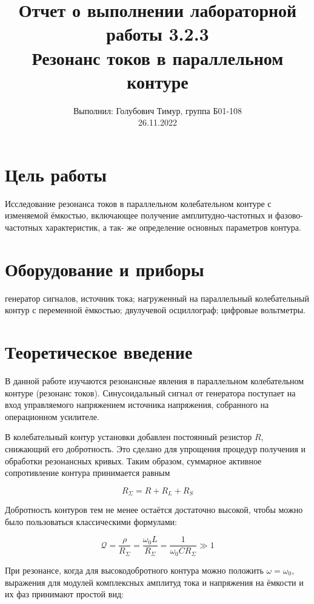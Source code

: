\documentclass[12pt,a4paper]{article}
\author{\normalsize Выполнил: Голубович Тимур, группа Б01-108 \\
	\normalsize 26.11.2022}
\date{}
\title{
	\large Отчет о выполнении лабораторной работы 3.2.3 \\
	\Large Резонанс токов в параллельном контуре \\ 
}
\begin{document}
	\maketitle
	
\section*{Цель работы}
Исследование резонанса токов в параллельном колебательном контуре с изменяемой ёмкостью, включающее получение амплитудно-частотных и фазово-частотных характеристик, а так- же определение основных параметров контура.


\section*{Оборудование и приборы}
генератор сигналов, источник тока;
нагруженный на параллельный колебательный контур с переменной ёмкостью;
двулучевой осциллограф;
цифровые вольтметры.

	
\section*{Теоретическое введение}

    В данной работе изучаются резонансные явления в параллельном колебательном контуре (резонанс токов). Синусоидальный сигнал от генератора поступает на вход управляемого напряжением источника напряжения, собранного на операционном усилителе.
    
    В колебательный контур установки добавлен постоянный резистор $R$, снижающий его
    добротность. Это сделано для упрощения процедур получения и обработки резонансных кривых. Таким образом, суммарное активное сопротивление контура принимается равным
    
    \begin{equation}
        R_{\Sigma} = R + R_L + R_S
    \end{equation}
    
    Добротность контуров тем не менее остаётся достаточно высокой, чтобы
    можно было пользоваться классическими формулами:
    
    \begin{equation}
        \mathcal{Q} = \frac{\rho}{R_{\Sigma}} = \frac{\omega_0 L}{R_{\Sigma}} 
    = \frac{1}{\omega_0 C R_{\Sigma}} \gg 1
    \end{equation}
    
    При резонансе, когда для высокодобротного контура можно положить $\omega = \omega_0$, выражения для модулей комплексных амплитуд тока и напряжения на ёмкости и их фаз принимают простой вид:
    
\end{document}
